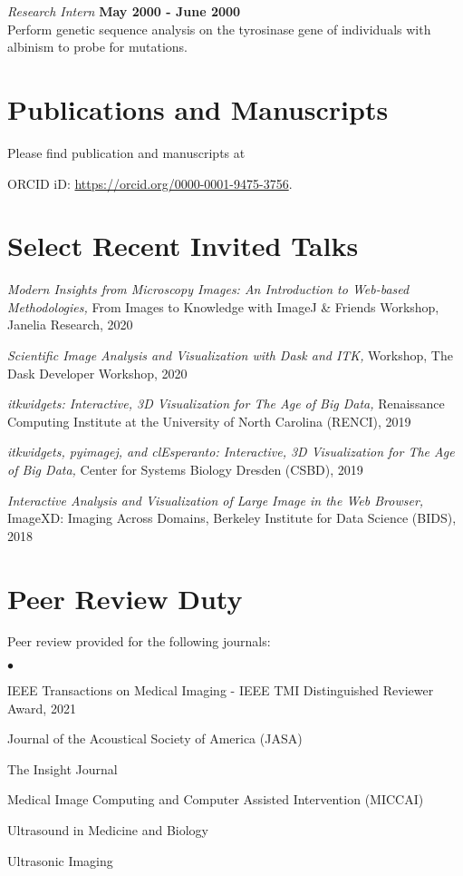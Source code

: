 \documentclass[margin,line]{res}
\newenvironment{list2}{
  \begin{list}{$\bullet$}{%
      \setlength{\itemsep}{0in}
      \setlength{\parsep}{0in} \setlength{\parskip}{0in}
      \setlength{\topsep}{0in} \setlength{\partopsep}{0in}
      \setlength{\leftmargin}{0.2in}}}{\end{list}}
\begin{document}
\begin{resume}
\vspace{-.3cm}
{\em Research Intern} \hfill {\bf May 2000 - June 2000} \\
Perform genetic sequence analysis on the tyrosinase gene of individuals with albinism to probe for mutations.

\section{\sc Publications and Manuscripts}

Please find publication and manuscripts at

\begin{center}
ORCID iD: \url{https://orcid.org/0000-0001-9475-3756}.
\end{center}

\section{\sc Select Recent Invited Talks}

\textit{Modern Insights from Microscopy Images: An Introduction to Web-based
Methodologies,} From Images to Knowledge with ImageJ \& Friends Workshop,
Janelia Research, 2020

\textit{Scientific Image Analysis and Visualization with Dask and ITK,} Workshop, The Dask Developer Workshop, 2020

\textit{itkwidgets: Interactive, 3D Visualization for The Age of Big Data,}
Renaissance Computing Institute at the University of North Carolina (RENCI), 2019

\textit{itkwidgets, pyimagej, and clEsperanto: Interactive, 3D Visualization
for The Age of Big Data,} Center for Systems Biology Dresden (CSBD), 2019

\textit{Interactive Analysis and Visualization of Large Image in the Web
Browser,} ImageXD: Imaging Across Domains, Berkeley Institute for Data Science (BIDS), 2018



\section{\sc Peer Review Duty}

Peer review provided for the following journals:\newline

\begin{list2}
\item[] IEEE Transactions on Medical Imaging - IEEE TMI Distinguished Reviewer Award, 2021
\item[] Journal of the Acoustical Society of America (JASA)
\item[] The Insight Journal
\item[] Medical Image Computing and Computer Assisted Intervention (MICCAI)
\item[] Ultrasound in Medicine and Biology
\item[] Ultrasonic Imaging
\end{list2}


\end{resume}
\end{document}
